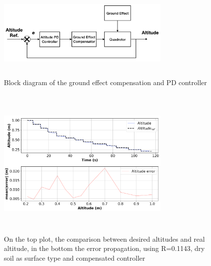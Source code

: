 \documentclass[twocolumn,10pt]{asme2ej}
\begin{document}
\begin{figure}[t]
  \begin{center}
  \setlength{\unitlength}{0.012500in}%
  \includegraphics[width=8.5cm, height=4.7cm]{Images/control_block_diag_2.png}
  \end{center}
  \caption{Block diagram of the ground effect compensation and PD controller}
  \label{ge_comp_block}
\end{figure}

\begin{figure}[t]
  \begin{center}
  \setlength{\unitlength}{0.012500in}%
  \includegraphics[width=8.5cm,height=7.5cm]{Images/alt_ref_error_subplot_comp.png}
  \end{center}
  \caption{On the top plot, the comparison between desired altitudes and real altitude, in the bottom the error propagation, using R=0.1143, dry soil as surface type and compensated controller}
  \label{altitudevs_error_comp}
\end{figure}
\end{document}
